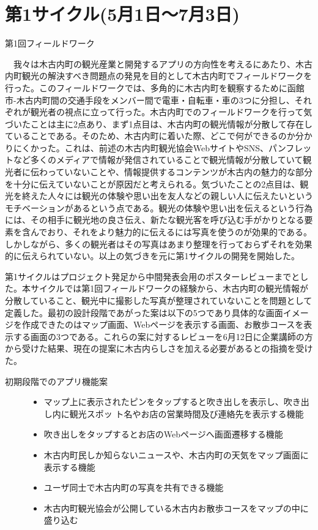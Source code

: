 \section{第1サイクル(5月1日〜7月3日)}

\begin{description}
\item[第1回フィールドワーク]\mbox{}
\end{description}
　我々は木古内町の観光産業と開発するアプリの方向性を考えるにあたり、木古内町観光の解決すべき問題点の発見を目的として木古内町でフィールドワークを行った。このフィールドワークでは、多角的に木古内町を観察するために函館市-木古内町間の交通手段をメンバー間で電車・自転車・車の3つに分担し、それぞれが観光者の視点に立って行った。木古内町でのフィールドワークを行って気づいたことは主に2点あり、まず1点目は、木古内町の観光情報が分散して存在していることである。そのため、木古内町に着いた際、どこで何ができるのか分かりにくかった。これは、前述の木古内町観光協会WebサイトやSNS、パンフレットなど多くのメディアで情報が発信されていることで観光情報が分散していて観光者に伝わっていないことや、情報提供するコンテンツが木古内の魅力的な部分を十分に伝えていないことが原因だと考えられる。気づいたことの2点目は、観光を終えた人々には観光の体験や思い出を友人などの親しい人に伝えたいというモチベーションがあるという点である。観光の体験や思い出を伝えるという行為には、その相手に観光地の良さ伝え、新たな観光客を呼び込む手がかりとなる要素を含んでおり、それをより魅力的に伝えるには写真を使うのが効果的である。しかしながら、多くの観光者はその写真はあまり整理を行っておらずそれを効果的に伝えられていない。以上の気づきを元に第1サイクルの開発を開始した。

第1サイクルはプロジェクト発足から中間発表会用のポスターレビューまでとした。本サイクルでは第1回フィールドワークの経験から、木古内町の観光情報が分散していること、観光中に撮影した写真が整理されていないことを問題として定義した。最初の設計段階であがった案は以下の5つであり具体的な画面イメージを作成できたのはマップ画面、Webページを表示する画面、お散歩コースを表示する画面の3つである。これらの案に対するレビューを6月12日に企業講師の方から受けた結果、現在の提案に木古内らしさを加える必要があるとの指摘を受けた。
\begin{description}
\item[初期段階でのアプリ機能案]\mbox{}
\begin{itemize}
 \item マップ上に表示されたピンをタップすると吹き出しを表示し、吹き出し内に観光スポッ ト名やお店の営業時間及び連絡先を表示する機能
  \item 吹き出しをタップするとお店のWebページへ画面遷移する機能
 \item 木古内町民しか知らないニュースや、木古内町の天気をマップ画面に表示する機能
 \item ユーザ同士で木古内町の写真を共有できる機能
 \item 木古内町観光協会が公開している木古内お散歩コースをマップの中に盛り込む
\end{itemize}
\end{description}

